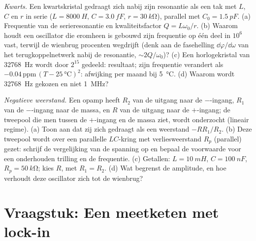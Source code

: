 \begin{exercise}[$\star\star\star$]\label{exo:b2:feedback-oscillators:11}
\emph{Kwarts.} Een kwartskristal gedraagt zich nabij zijn resonantie als een
tak met $L$, $C$ en $r$ in serie ($L = \qty{8000}{H}$, $C = \qty{3.0}{fF}$,
$r =
\qty{30}{k\ohm}$), parallel met $C_0 = \qty{1.5}{pF}$. (a) Frequentie
van de serieresonantie en kwaliteitsfactor $Q = L\omega_0/r$. (b) Waarom
houdt een oscillator die eromheen is gebouwd zijn frequentie op één deel in
$10^6$ vast, terwijl de wienbrug procenten wegdrijft (denk aan de
fasehelling $\dd\varphi/\dd\omega$ van het terugkoppelnetwerk nabij de
resonantie, $\sim 2Q/\omega_0$)? (c) Een horlogekristal van \qty{32768}{Hz}
wordt door $2^{15}$ gedeeld: resultaat; zijn frequentie verandert als
$-0.04\,\text{ppm}\,(T - \qty{25}{\degreeCelsius})^2$: afwijking per maand
bij \qty{5}{\degreeCelsius}. (d) Waarom wordt \qty{32768}{Hz} gekozen en
niet \qty{1}{MHz}?
\end{exercise}

\begin{exercise}[$\star\star\star$]\label{exo:b2:feedback-oscillators:12}
\emph{Negatieve weerstand.} Een opamp heeft $R_2$ van de uitgang naar de
$-$-ingang, $R_1$ van de $-$-ingang naar de massa, en $R$ van de uitgang
naar de $+$-ingang; de tweepool die men tussen de $+$-ingang en de massa
ziet, wordt onderzocht (lineair regime). (a) Toon aan dat zij zich gedraagt
als een weerstand $-RR_1/R_2$. (b) Deze tweepool wordt over een parallelle
$LC$-kring met verliesweerstand $R_p$ (parallel) gezet: schrijf de
vergelijking van de spanning op en bepaal de voorwaarde voor een onderhouden
trilling en de frequentie. (c) Getallen: $L
= \qty{10}{mH}$,
$C = \qty{100}{nF}$, $R_p = \qty{50}{k\ohm}$; kies $R$, met $R_1 =
R_2$. (d)
Wat begrenst de amplitude, en hoe verhoudt deze oscillator zich tot de
wienbrug?
\end{exercise}

\section{Vraagstuk: Een meetketen met lock-in}

